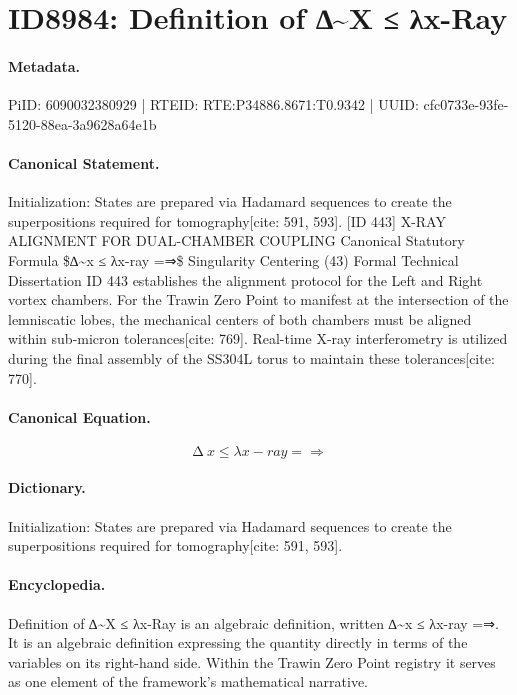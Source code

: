 \section*{ID8984: Definition of ∆\textasciitilde{}X ≤ λx-Ray}
\paragraph{Metadata.}
PiID: 6090032380929 | RTEID: RTE:P34886.8671:T0.9342 | UUID: cfc0733e-93fe-5120-88ea-3a9628a64e1b

\paragraph{Canonical Statement.}
Initialization: States are prepared via Hadamard sequences to create the superpositions required for tomography[cite: 591, 593]. [ID 443] X-RAY ALIGNMENT FOR DUAL-CHAMBER COUPLING Canonical Statutory Formula \$∆\textasciitilde{}x ≤ λx-ray =⇒\$ Singularity Centering (43) Formal Technical Dissertation ID 443 establishes the alignment protocol for the Left and Right vortex chambers. For the Trawin Zero Point to manifest at the intersection of the lemniscatic lobes, the mechanical centers of both chambers must be aligned within sub-micron tolerances[cite: 769]. Real-time X-ray interferometry is utilized during the final assembly of the SS304L torus to maintain these tolerances[cite: 770].

\paragraph{Canonical Equation.}
\[
∆~x ≤ λx-ray =⇒
\]

\paragraph{Dictionary.}
Initialization: States are prepared via Hadamard sequences to create the superpositions required for tomography[cite: 591, 593].

\paragraph{Encyclopedia.}
Definition of ∆\textasciitilde{}X ≤ λx-Ray is an algebraic definition, written ∆\textasciitilde{}x ≤ λx-ray =⇒. It is an algebraic definition expressing the quantity directly in terms of the variables on its right-hand side. Within the Trawin Zero Point registry it serves as one element of the framework's mathematical narrative.
